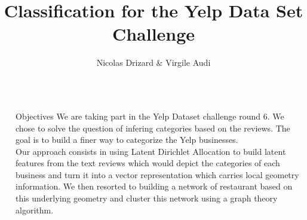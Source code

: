 \documentclass[final]{beamer}
\title{Classification for the Yelp Data Set Challenge} %
\author{Nicolas Drizard \& Virgile Audi} %
\institute{CS281 Final Project, Harvard University} %
\newlength{\sepwid}
\newlength{\onecolwid}
\begin{document}

\setlength{\belowcaptionskip}{2ex} %
\setlength\belowdisplayshortskip{2ex} %

\begin{frame}[t] %

\begin{columns}[t] %

\begin{column}{\sepwid}\end{column} %

\begin{column}{\onecolwid}\vspace{-0.6in} %


\begin{alertblock}{Objectives}
\small
We are taking part in the Yelp Dataset challenge round 6. We chose to solve the question of infering categories based on the reviews. The goal is to build a finer way to categorize the Yelp businesses.\\

Our approach consists in using Latent Dirichlet Allocation to build latent features from the text reviews which would depict the categories of each business and turn it into a vector representation which carries local geometry information. We then resorted to building a network of restaurant based on this underlying geometry and cluster this network using a graph theory algorithm.\\

\end{alertblock}



\end{column}
\end{columns}
\end{frame}
\end{document}
